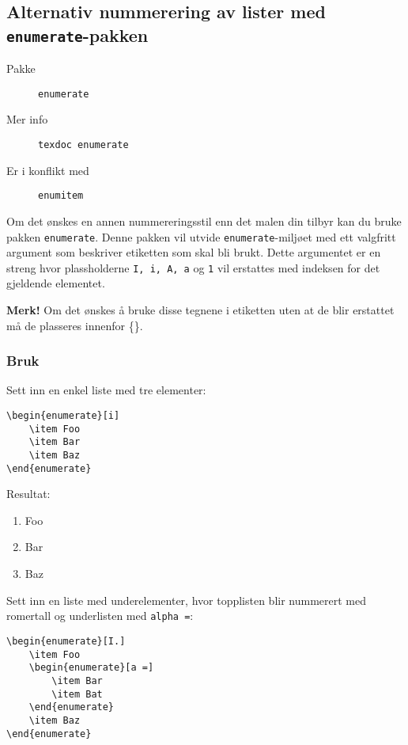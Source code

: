 \subsection{Alternativ nummerering av lister med \texttt{enumerate}-pakken}
\label{pkg:enumerate}
\begin{description}
    \item[Pakke] \texttt{enumerate}
    \item[Mer info] \texttt{texdoc enumerate}
    \item[Er i konflikt med] \texttt{enumitem}
\end{description}

Om det ønskes en annen nummereringsstil enn det malen din tilbyr kan du bruke pakken \texttt{enumerate}.
Denne pakken vil utvide \texttt{enumerate}-miljøet med ett valgfritt argument som beskriver etiketten som skal bli brukt.
Dette argumentet er en streng hvor plassholderne \texttt{I, i, A, a} og \texttt{1} vil erstattes med indeksen for det gjeldende
elementet.

\textbf{Merk!} Om det ønskes å bruke disse tegnene i etiketten uten at de blir erstattet må de plasseres innenfor \{\}.

\subsubsection*{Bruk}
Sett inn en enkel liste med tre elementer:
\vspace{0.75em}
\begin{lstlisting}[language=Tex]
\begin{enumerate}[i]
    \item Foo
    \item Bar
    \item Baz
\end{enumerate}
\end{lstlisting}

\noindent Resultat:
\begin{enumerate}[i]
    \item Foo
    \item Bar
    \item Baz
\end{enumerate}
\vspace{0.75em}


\horizontalrule


\vspace{0.75em}
\noindent Sett inn en liste med underelementer, hvor topplisten blir nummerert med romertall og underlisten med \texttt{alpha =}:
\vspace{0.75em}
\begin{lstlisting}[language=Tex]
\begin{enumerate}[I.]
    \item Foo
    \begin{enumerate}[a =]
        \item Bar
        \item Bat
    \end{enumerate}
    \item Baz
\end{enumerate}
\end{lstlisting}
\vspace{0.75em}

